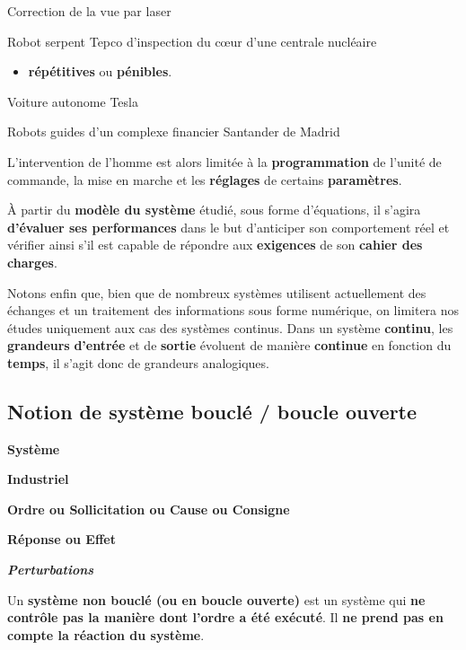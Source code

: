 
Correction de la vue par laser

Robot serpent Tepco d'inspection du cœur d'une centrale nucléaire

\begin{itemize}
\item
  \textbf{répétitives} ou \textbf{pénibles}.
\end{itemize}


Voiture autonome Tesla

Robots guides d'un complexe financier Santander de Madrid


L'intervention de l'homme est alors limitée à la \textbf{programmation}
de l'unité de commande, la mise en marche et les \textbf{réglages} de
certains \textbf{paramètres}.

À partir du \textbf{modèle du système} étudié, sous forme d'équations,
il s'agira \textbf{d'évaluer ses performances} dans le but d'anticiper
son comportement réel et vérifier ainsi s'il est capable de répondre aux
\textbf{exigences} de son \textbf{cahier des charges}.

Notons enfin que, bien que de nombreux systèmes utilisent actuellement
des échanges et un traitement des informations sous forme numérique, on
limitera nos études uniquement aux cas des systèmes continus. Dans un
système \textbf{continu}, les \textbf{grandeurs} \textbf{d'entrée} et de
\textbf{sortie} évoluent de manière \textbf{continue} en fonction du
\textbf{temps}, il s'agit donc de grandeurs analogiques.

\subsection{Notion de système bouclé / boucle
ouverte}\label{notion-de-systuxe8me-boucluxe9-boucle-ouverte}

\textbf{Système}

\textbf{Industriel}

\textbf{Ordre ou Sollicitation ou Cause ou Consigne}

\textbf{Réponse ou Effet}

\emph{\textbf{Perturbations}}

Un \textbf{système non bouclé (ou en boucle ouverte)} est un système qui
\textbf{ne contrôle pas la manière dont l'ordre a été exécuté}. Il
\textbf{ne prend pas en compte la réaction du système}.

